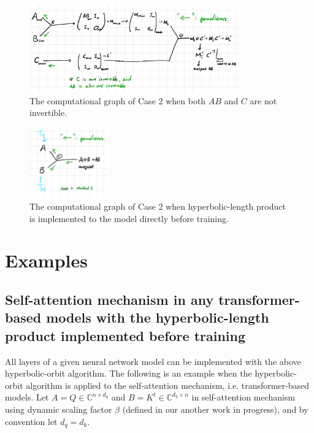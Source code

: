 \documentclass{article}
\theoremstyle{plain}
\theoremstyle{plain} %
\theoremstyle{definition}  %
\theoremstyle{remark}  %
\theoremstyle{plain}
\begin{document}
\begin{figure}[H]
\caption{The computational graph of Case 2 when both $AB$ and $C$ are not invertible.}
\centering
\includegraphics[width=0.8\textwidth]{4.png}
\end{figure}

\begin{figure}[H]
\caption{The computational graph of Case 2 when hyperbolic-length product is implemented to the model directly before training.}
\centering
\includegraphics[width=0.3\textwidth]{5.png}
\end{figure}






 
\section{Examples}
\subsection{Self-attention mechanism in any transformer-based models with the hyperbolic-length product implemented before training}
All layers of a given neural network model can be implemented with the above hyperbolic-orbit algorithm. The following is an example when the hyperbolic-orbit algorithm is applied to the self-attention mechanism, i.e. transformer-based models.
Let $A=Q\in \mathbb{C}^{n\times d_q}$ and $B=K^t\in \mathbb{C}^{d_k\times n}$ in self-attention mechanism\cite{vaswani2017attention} using dynamic scaling factor $\beta$ (defined in our another work in progress), and by convention let $d_q=d_k$.
\end{document}
